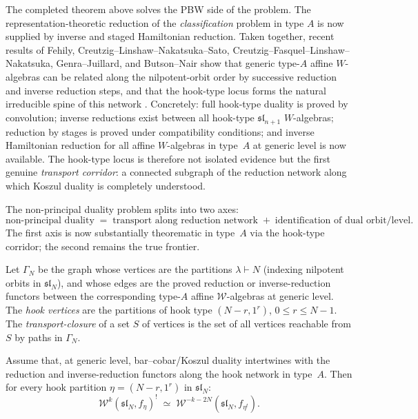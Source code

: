 The completed theorem above solves the PBW side of the problem.  The
representation-theoretic reduction of the \emph{classification} problem in type
$A$ is now supplied by inverse and staged Hamiltonian reduction.  Taken
together, recent results of Fehily, Creutzig--Linshaw--Nakatsuka--Sato,
Creutzig--Fasquel--Linshaw--Nakatsuka, Genra--Juillard, and Butson--Nair show
that generic type-$A$ affine $W$-algebras can be related along the
nilpotent-orbit order by successive reduction and inverse reduction steps, and
that the hook-type locus forms the natural irreducible spine of this network
\cite{FehilyHook,CLNS24,CFLN24,GenraStages,ButsonNair}.  Concretely:
full hook-type duality is proved by convolution; inverse reductions exist
between all hook-type $\mathfrak{sl}_{n+1}$ $W$-algebras; reduction by stages
is proved under compatibility conditions; and inverse Hamiltonian reduction for
all affine $W$-algebras in type~$A$ at generic level is now available.  The
hook-type locus is therefore not isolated evidence but the first genuine
\emph{transport corridor}: a connected subgraph of the reduction network along
which Koszul duality is completely understood.

\begin{principle}
\label{princ:transport-orbit-factorization}
The non-principal duality problem splits into two axes:
\[
\text{non-principal duality}
\;=\;
\text{transport along reduction network}
\;+\;
\text{identification of dual orbit/level}.
\]
The first axis is now substantially theorematic in type~$A$ via
the hook-type corridor; the second remains the true frontier.
\end{principle}

\begin{definition}
\label{def:reduction-graph}
Let $\Gamma_N$ be the graph whose vertices are the partitions
$\lambda \vdash N$ (indexing nilpotent orbits in
$\mathfrak{sl}_N$), and whose edges are the proved
reduction or inverse-reduction functors between the corresponding
type-$A$ affine $\mathcal{W}$-algebras at generic level.
The \emph{hook vertices} are the partitions of hook type
$(N-r, 1^r)$, $0 \leq r \leq N-1$.
The \emph{transport-closure} of a set $S$ of vertices is the set
of all vertices reachable from $S$ by paths in $\Gamma_N$.
\end{definition}

\begin{theorem}
\label{thm:hook-transport-corridor}
Assume that, at generic level, bar--cobar/Koszul duality intertwines
with the reduction and inverse-reduction functors along the hook
network in type~$A$.  Then for every hook partition
$\eta = (N-r, 1^r)$ in $\mathfrak{sl}_N$:
\[
\mathcal{W}^k(\mathfrak{sl}_N, f_\eta)^!
\;\simeq\;
\mathcal{W}^{-k-2N}(\mathfrak{sl}_N, f_{\eta^t}).
\]
\end{theorem}

